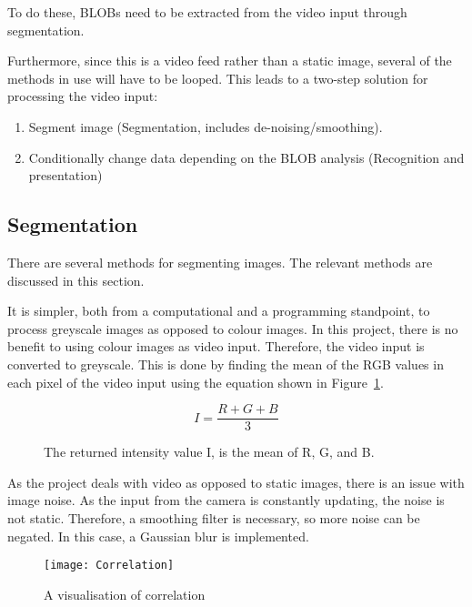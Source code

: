 To do these, BLOBs need to be extracted from the video input through segmentation.  

Furthermore, since this is a video feed rather than a static image, several of the methods in use will have to be looped. This leads to a two-step solution for processing the video input:

\begin{enumerate}
\item Segment image (Segmentation, includes de-noising/smoothing).
\item Conditionally change data depending on the BLOB analysis (Recognition and presentation)
\end{enumerate}


\subsection{Segmentation}
There are several methods for segmenting images. The relevant methods are discussed in this section. 

It is simpler, both from a computational and a programming standpoint, to process greyscale images as opposed to colour images. In this project, there is no benefit to using colour images as video input. Therefore, the video input is converted to greyscale. This is done by finding the mean of the RGB values in each pixel of the video input using the equation shown in Figure~\ref{fig:rgbToGreyEquation}.

\begin{figure}[h]
	\centering
	\begin{displaymath}
	I = \frac{R + G + B}{3}
	\end{displaymath}
	\caption{The returned intensity value I, is the mean of R, G, and B. \label{fig:rgbToGreyEquation}}
\end{figure}

As the project deals with video as opposed to static images, there is an issue with image noise. As the input from the camera is constantly updating, the noise is not static. Therefore, a smoothing filter is necessary, so more noise can be negated. In this case, a Gaussian blur is implemented.

\begin{figure}[h]
  \begin{center}
    \texttt{[image: Correlation]}
  \end{center}
  \caption{A visualisation of correlation \label{Fig:Correlation}\citep{moeslund_introduction_2012}}
\end{figure}

